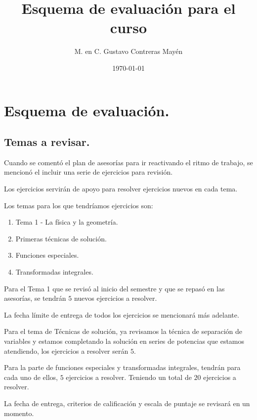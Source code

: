 
\title{Esquema de evaluación para el curso} \vspace{-3ex}
\author{M. en C. Gustavo Contreras Mayén}
\date{\today}
\newcommand{\Cancel}[2][black]{{\color{#1}\cancel{\color{black}#2}}}

\vspace{-4cm}
\maketitle
\fontsize{14}{14}\selectfont


\section{Esquema de evaluación.}
\subsection{Temas a revisar.}

Cuando se comentó el plan de asesorías para ir reactivando el ritmo de trabajo, se mencionó el incluir una serie de ejercicios para revisión.
\par
Los ejercicios servirán de apoyo para resolver ejercicios nuevos en cada tema.
\par
Los temas para los que tendríamos ejercicios son:
\begin{enumerate}
\item Tema 1 - La física y la geometría.
\item Primeras técnicas de solución.
\item Funciones especiales.
\item Transformadas integrales.
\end{enumerate}

Para el Tema 1 que se revisó al inicio del semestre y que se repasó en las asesorías, se tendrán $5$ nuevos ejercicios a resolver.
\par
La fecha límite de entrega de todos los ejercicios se mencionará más adelante.
\par
Para el tema de Técnicas de solución, ya revisamos la técnica de separación de variables y estamos completando la solución en series de potencias que estamos atendiendo, los ejercicios a resolver serán $5$.
\par
Para la parte de funciones especiales y transformadas integrales, tendrán para cada uno de ellos, $5$ ejercicios a resolver. Teniendo un total de $20$ ejercicios a resolver.
\par
La fecha de entrega, criterios de calificación y escala de puntaje se revisará en un momento.


